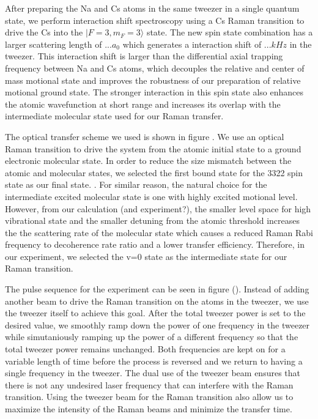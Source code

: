 \documentclass[aps,prl,twocolumn,groupedaddress]{revtex4-1}
\newcommand{\todo}[1]{}
\begin{document}
After preparing the Na and Cs atoms in the same tweezer in a single quantum state, we perform interaction shift spectroscopy using a Cs Raman transition to drive the Cs into the $|F=3,m_F=3\rangle$ state. The new spin state combination has a larger scattering length of $... a_0$ which generates a interaction shift of $... kHz$ in the tweezer. This interaction shift is larger than the differential axial trapping frequency between Na and Cs atoms, which decouples the relative and center of mass motional state and improves the robustness of our preparation of relative motional ground state. The stronger interaction in this spin state also enhances the atomic wavefunction at short range and increases its overlap with the intermediate molecular state used for our Raman transfer.


The optical transfer scheme we used is shown in figure \todo{}.
We use an optical Raman transition to drive the system from the atomic initial state to a
ground electronic molecular state.
In order to reduce the size mismatch between the atomic and molecular states,
we selected the first bound state for the 3322 spin state \todo{asymtopt to the 3322 threshold?} as our final state. \todo{move selection of intermediate state to intro?}.
For similar reason, the natural choice for the intermediate excited molecular state is one
with highly excited motional level.
However, from our calculation (and experiment?), the smaller level space for high
vibrational state and the smaller detuning from the atomic threshold increases the
the scattering rate of the molecular state which causes a reduced Raman Rabi frequency
to decoherence rate ratio and a lower transfer efficiency.
Therefore, in our experiment, we selected the v=0 state as the intermediate state for our
Raman transition.

The pulse sequence for the experiment can be seen in figure (). Instead of adding another beam to drive the Raman transition on the atoms in the tweezer, we use the tweezer itself to achieve this goal. After the total tweezer power is set to the desired value, we smoothly ramp down the power of one frequency in the tweezer while simutaniously ramping up the power of a different frequency so that the total tweezer power remains unchanged. Both frequencies are kept on for a variable length of time before the process is reversed and we return to having a single frequency in the tweezer. The dual use of the tweezer beam ensures that there is not any undesired laser frequency that can interfere with the Raman transition. Using the tweezer beam for the Raman transition also allow us to maximize the intensity of the Raman beams and minimize the transfer time.
\end{document}
